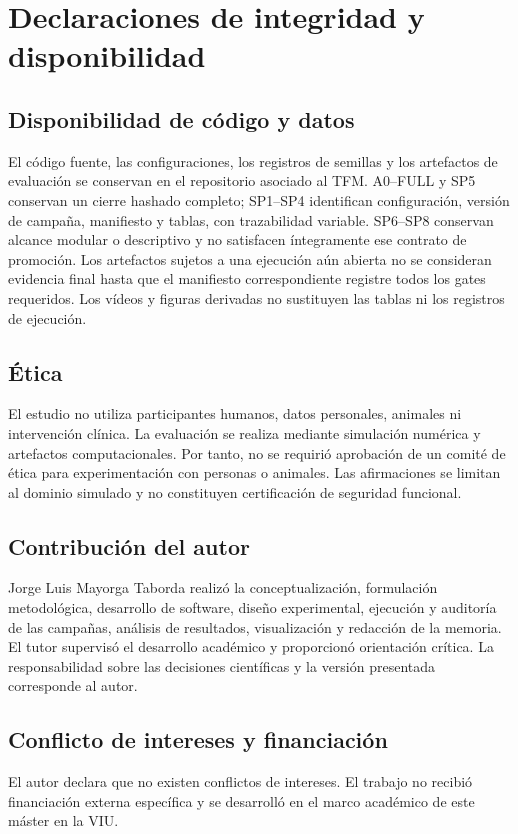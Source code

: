 \section{Declaraciones de integridad y disponibilidad}
\label{app:declaraciones-integridad}

\begingroup
\footnotesize
{}

\subsection*{Disponibilidad de código y datos}

El código fuente, las configuraciones, los registros de semillas y los artefactos de evaluación se conservan en el repositorio asociado al TFM. A0--FULL y SP5 conservan un cierre hashado completo; SP1--SP4 identifican configuración, versión de campaña, manifiesto y tablas, con trazabilidad variable. SP6--SP8 conservan alcance modular o descriptivo y no satisfacen íntegramente ese contrato de promoción. Los artefactos sujetos a una ejecución aún abierta no se consideran evidencia final hasta que el manifiesto correspondiente registre todos los gates requeridos. Los vídeos y figuras derivadas no sustituyen las tablas ni los registros de ejecución.

\subsection*{Ética}

El estudio no utiliza participantes humanos, datos personales, animales ni intervención clínica. La evaluación se realiza mediante simulación numérica y artefactos computacionales. Por tanto, no se requirió aprobación de un comité de ética para experimentación con personas o animales. Las afirmaciones se limitan al dominio simulado y no constituyen certificación de seguridad funcional.

\subsection*{Contribución del autor}

Jorge Luis Mayorga Taborda realizó la conceptualización, formulación metodológica, desarrollo de software, diseño experimental, ejecución y auditoría de las campañas, análisis de resultados, visualización y redacción de la memoria. El tutor supervisó el desarrollo académico y proporcionó orientación crítica. La responsabilidad sobre las decisiones científicas y la versión presentada corresponde al autor.

\subsection*{Conflicto de intereses y financiación}

El autor declara que no existen conflictos de intereses. El trabajo no recibió financiación externa específica y se desarrolló en el marco académico de este máster en la VIU.

\endgroup
